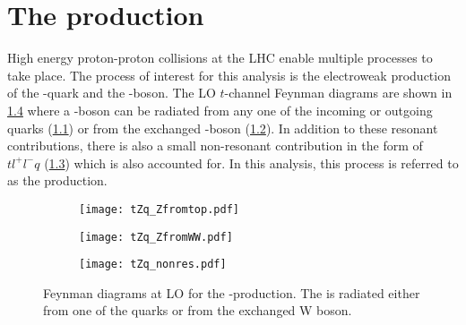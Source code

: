 
\chapter{The \tZqsec production}
\label{sec:tZq}

High energy proton-proton collisions at the LHC enable
multiple processes to take place. The process of interest for this analysis 
is the electroweak production of the \Ptop-quark and the 
\PZ-boson. The LO $t$-channel Feynman diagrams are shown in \cref{fig:tZqfeyn} where
a \PZ-boson can be radiated from any one of the incoming or outgoing quarks (\cref{fig:tZqfeyna})
or from the exchanged \PW-boson (\cref{fig:tZqfeynb}). In addition to these
resonant contributions, there is also a small non-resonant contribution 
in the form of $tl^+l^-q$ (\cref{fig:tZqfeync}) which is also accounted for. 
In this analysis, this process
is referred to as the \tZq production. 

\begin{figure}[htbp]
    \centering
    \begin{subfigure}{0.35\figwidth}
      \centering
      \texttt{[image: tZq\_Zfromtop.pdf]}
      \caption{}
      \label{fig:tZqfeyna}
    \end{subfigure}
    \begin{subfigure}{0.35\figwidth}
      \centering
      \texttt{[image: tZq\_ZfromWW.pdf]}
      \caption{}
      \label{fig:tZqfeynb}
    \end{subfigure}
  
  
  \medskip
  
  
  \begin{subfigure}{0.35\figwidth}
      \centering
      \texttt{[image: tZq\_nonres.pdf]}
      \caption{}
         \label{fig:tZqfeync}
    \end{subfigure}
  
  \caption[Feynman diagrams at LO for the \tZq-production]{Feynman diagrams at 
  LO for the \tZq-production. The \PZ is radiated either from one of the
  quarks or from the exchanged W boson. }
  \label{fig:tZqfeyn}
  \end{figure}

